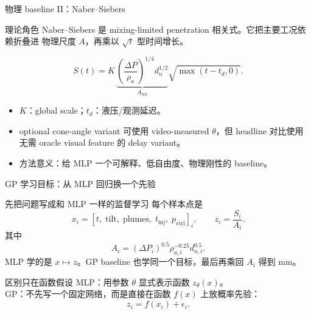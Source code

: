 \documentclass[aspectratio=169,11pt]{beamer}
\begin{document}
\begin{frame}{物理 baseline II：Naber--Siebers}
\small
\begin{block}{理论角色}
\footnotesize
Naber--Siebers 是 mixing-limited penetration 相关式。它把主要工况依赖折叠进
物理尺度 \(A\)，再乘以 \(\sqrt{t}\) 型时间增长。
\end{block}

\[
S(t)=K\,
\underbrace{\left(\frac{\Delta P}{\rho_a}\right)^{1/4}d_n^{1/2}}_{A_{\mathrm{NS}}}
\sqrt{\max(t-t_d,0)}.
\]

\begin{itemize}
  \item \(K\)：global scale；\(t_d\)：液压/观测延迟。
  \item optional cone-angle variant 可使用 video-measured \(\theta\)，但 headline
  对比使用无需 oracle visual feature 的 delay variant。
  \item 方法意义：给 MLP 一个可解释、低自由度、物理刚性的 baseline。
\end{itemize}
\end{frame}

\begin{frame}{GP 学习目标：从 MLP 回归换一个先验}
\small
\begin{block}{先把问题写成和 MLP 一样的监督学习}
\footnotesize
每个样本点是
\[
x_i=[t,\;\mathrm{tilt},\;\mathrm{plumes},\;t_{\mathrm{inj}},\;p_{\mathrm{ctrl}}]_i,
\qquad
z_i=\frac{S_i}{A_i}.
\]
其中
\[
A_i=(\Delta P_i)^{0.5}\rho_{a,i}^{-0.25}d_{n,i}^{0.5}.
\]
MLP 学的是 \(x\mapsto z\)。GP baseline 也学同一个目标，最后再乘回 \(A_i\) 得到 mm。
\end{block}

\begin{block}{区别只在函数假设}
\footnotesize
MLP：用参数 \(\theta\) 显式表示函数 \(z_\theta(x)\)。\\
GP：不先写一个固定网络，而是直接在函数 \(f(x)\) 上放概率先验：
\[
z_i=f(x_i)+\epsilon_i.
\]
\end{block}
\end{frame}
\end{document}
